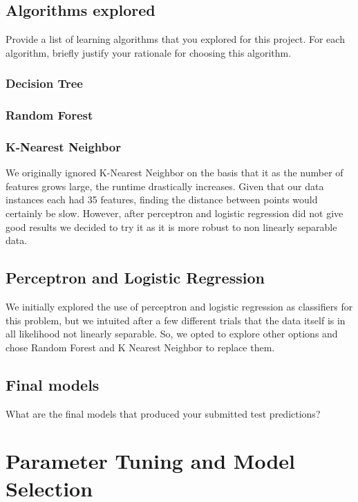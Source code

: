 \documentclass[11pt,a4paper]{article}
\begin{document}
\subsection{Algorithms explored}
Provide a list of learning algorithms that you explored for this project. For each algorithm, briefly justify your rationale for choosing this algorithm.

\subsubsection{Decision Tree}


\subsubsection{Random Forest}


\subsubsection{K-Nearest Neighbor}
We originally ignored K-Nearest Neighbor on the basis that it as the number of features grows large, the runtime drastically increases. Given that our data instances each had 35 features, finding the distance between points would certainly be slow. However, after perceptron and logistic regression did not give good results we decided to try it as it is more robust to non linearly separable data.


\subsection{Perceptron and Logistic Regression}
We initially explored the use of perceptron and logistic regression as classifiers for this problem, but we intuited after a few different trials that the data itself is in all likelihood not linearly separable. So, we opted to explore other options and chose Random Forest and K Nearest Neighbor to replace them.


\subsection{Final models}
What are the final models that produced your submitted test predictions?


\section{Parameter Tuning and Model Selection }
\end{document}
